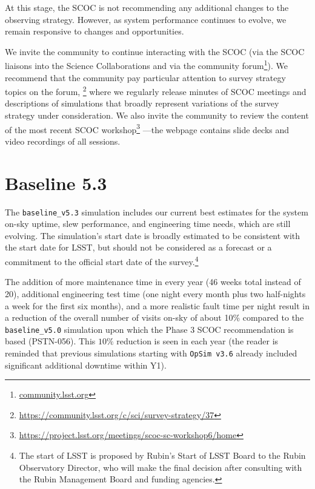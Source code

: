 \documentclass[SE,authoryear,toc]{lsstdoc}
\begin{document}
At this stage, the SCOC is not recommending any additional changes to the observing strategy. However, as system performance continues to evolve, we remain responsive to changes and opportunities. 

We invite the community to continue interacting with the SCOC (via the SCOC liaisons into the Science Collaborations and via the community forum\footnote{\url{community.lsst.org}}). We recommend that the community pay particular attention to survey strategy topics on the forum, \footnote{\url{https://community.lsst.org/c/sci/survey-strategy/37}} where we regularly release minutes of SCOC meetings and descriptions of simulations that broadly represent variations of the survey strategy under consideration. We also invite the community to review the content of the most recent SCOC workshop\footnote{\url{https://project.lsst.org/meetings/scoc-sc-workshop6/home}} ---the webpage contains slide decks and video recordings of all sessions.%

\section{Baseline 5.3}\label{sec:opsims}

The \texttt{baseline\_v5.3} simulation includes our current best estimates for the system on-sky uptime, slew performance, and engineering time needs, which are still evolving. The simulation’s start date is broadly estimated to be consistent with the start date for LSST, but should not be considered as a forecast or a commitment to the official start date of the survey.\footnote{The start of LSST is proposed by Rubin’s Start of LSST Board to the Rubin Observatory Director, who will make the final decision after consulting with the Rubin Management Board and funding agencies.}

The addition of more maintenance time in every year (46 weeks total instead of 20), additional engineering test time (one night every month plus two half-nights a week for the first six months), and a more realistic fault time per night result in a reduction of the overall number of visits on-sky of about 10\% compared to the \texttt{baseline\_v5.0} simulation upon which the Phase 3 SCOC recommendation is based (PSTN-056). This $10\%$ reduction is seen in each year (the reader is reminded that previous simulations starting with \texttt{OpSim v3.6} already included significant additional downtime within Y1).
\end{document}
